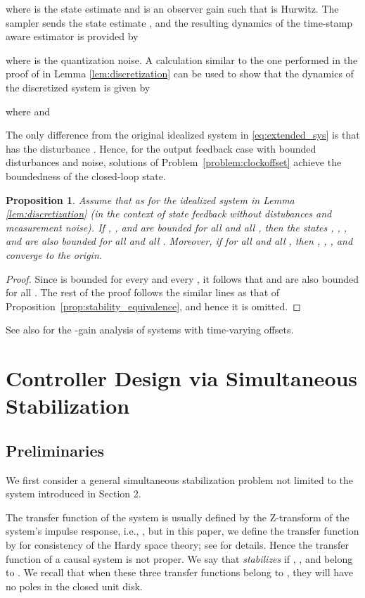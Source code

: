 \documentclass[letterpaper, 12pt, draftcls, onecolumn]{ieeeconf}
\newtheorem{proposition}[theorem]{Proposition}
\begin{document}
where  is the state estimate and  is an observer gain such that
 is Hurwitz.
The sampler sends the state estimate , 
and
the resulting dynamics of the time-stamp aware estimator  is provided by
 
where  is the quantization noise. 
A calculation similar to the one performed in the proof of
in Lemma \ref{lem:discretization} can be used to show
that the dynamics of the discretized system  is given by

where  and

The only difference from
the original idealized system  in \eqref{eq:extended_sys} is
that  has the disturbance . 
Hence, 
for the output feedback case with
bounded disturbances and noise,
solutions of Problem~\ref{problem:clockoffset} achieve
the boundedness of the closed-loop state.
\begin{proposition}
	Assume that  as 
	for the idealized system  in Lemma \ref{lem:discretization}
	(in the context of state feedback without distubances and measurement noise).
	If , , and  are bounded for all  and 
	all ,
then the states
	, , , and  are also bounded for all  and all
	.
	Moreover, if  for all  and 
	all , then
	, , , and  converge to the origin.
\end{proposition}
\begin{proof}
	Since 
	is bounded for every  and every , 
	it follows that  and  are also bounded
	for all .
	The rest of the proof follows the similar lines as that of 
	Proposition~\ref{prop:stability_equivalence}, 
	and hence it is omitted.
\end{proof}






See also \cite{Wakaiki2016ACC} for the -gain analysis 
of systems with time-varying offsets.




\section{Controller Design via Simultaneous Stabilization}
\subsection{Preliminaries}
We first consider a general simultaneous stabilization problem 
not limited to the system introduced in Section 2.

The transfer function  
of the system 
is usually defined by the Z-transform of the system's impulse response,
i.e.,
,
but in this paper, we define the transfer function  
by  for 
consistency of the Hardy space theory;
see \cite[Sec. 2.2]{vidyasagar1985} for details.
Hence the transfer function of a causal system is not proper.
We say that  
{\it stabilizes} 
if , , and  belong
to . 
We recall that when these three transfer functions belong to 
, 
they will have no poles in the closed unit disk.
\end{document}
